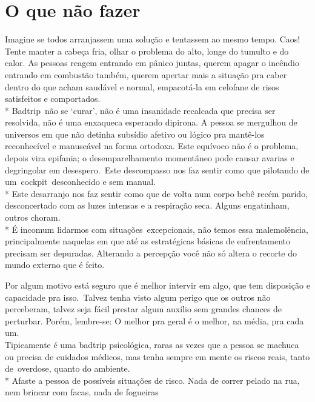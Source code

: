 \section*{O que não fazer}
\par
    \indent Imagine se todos arranjassem uma solução e tentassem ao mesmo tempo. Caos! 
    Tente manter a cabeça fria, olhar o problema do alto, longe do tumulto e do 
    calor. As pessoas reagem entrando em pânico juntas, querem apagar o incêndio 
    entrando em combustão também, querem apertar mais a situação pra
    caber dentro do que acham saudável e normal, empacotá-la em celofane de risos 
    satisfeitos e comportados.\\*
    Badtrip não se `curar', não é uma insanidade recalcada que precisa ser 
    resolvida, não é uma enxaqueca esperando dipirona. A
    pessoa se mergulhou de universos em que não detinha subsídio afetivo ou lógico 
    pra mantê-los reconhecível e manuseável na
    forma ortodoxa. Este equívoco não é o problema, depois vira epifania; o 
    desemparelhamento momentâneo pode causar avarias e
    degringolar em desespero. Este descompasso nos faz sentir como que pilotando de 
    um cockpit desconhecido e sem manual.\\*
    Este desarranjo nos faz sentir como que de volta num corpo bebê recém parido, 
    desconcertado com as luzes intensas e a respiração
    seca. Alguns engatinham, outros choram.\\*
    \indent É incomum lidarmos com situações excepcionais, não temos essa 
    malemolência, principalmente naquelas em que até as estratégicas
    básicas de enfrentamento precisam ser depuradas. Alterando a percepção você não 
    só altera o recorte do mundo externo que é
    feito.\\
\par
\noindent Por algum motivo está seguro que é melhor intervir em algo, que tem disposição e capacidade pra isso. Talvez tenha
visto algum perigo que os outros não perceberam, talvez seja fácil prestar algum auxílio sem grandes chances de perturbar.
Porém, lembre-se: O melhor pra geral é o melhor, na média, pra cada um.\\
\indent Tipicamente é uma badtrip psicológica, raras as vezes que a pessoa se machuca ou precisa de cuidados médicos, mas tenha sempre
em mente os riscos reais, tanto de overdose, quanto do ambiente.\\*
\indent Afaste a pessoa de possíveis situações de risco. Nada de correr pelado na rua, nem brincar com facas, nada de fogueiras
